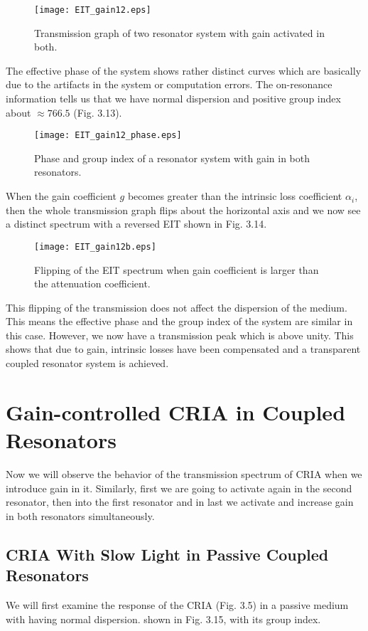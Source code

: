 \begin{figure}[h]
\centering
\texttt{[image: EIT\_gain12.eps]}
\caption{Transmission graph of two resonator system with gain activated in both.}
\end{figure}

The effective phase of the system shows rather distinct curves which are basically due to the artifacts in the system or computation errors. The on-resonance information tells us that we have normal dispersion and positive group index about $\approx 766.5$ (Fig. 3.13). 

\begin{figure}[h]
\centering
\texttt{[image: EIT\_gain12\_phase.eps]}
\caption{Phase and group index of a resonator system with gain in both resonators.}
\end{figure}

When the gain coefficient $g$ becomes greater than the intrinsic loss coefficient $\alpha_{i}$, then the whole transmission graph flips about the horizontal axis and we now see a distinct spectrum with a reversed EIT shown in Fig. 3.14.

\begin{figure}[h]
\centering
\texttt{[image: EIT\_gain12b.eps]}
\caption{Flipping of the EIT spectrum when gain coefficient is larger than the attenuation coefficient.}
\end{figure}

This flipping of the transmission does not affect the dispersion of the medium. This means the effective phase and the group index of the system are similar in this case. However, we now have a transmission peak which is above unity. This shows that due to gain, intrinsic losses have been compensated and a transparent coupled resonator system is achieved.


  

\section{Gain-controlled CRIA in Coupled Resonators}
Now we will observe the behavior of the transmission spectrum of CRIA when we introduce gain in it. Similarly, first we are going to activate again in the second resonator, then into the first resonator and in last we activate and increase gain in both resonators simultaneously. 

\subsection{CRIA With Slow Light in Passive Coupled Resonators}
We will first examine the response of the CRIA (Fig. 3.5) in a passive medium with having normal dispersion. shown in Fig. 3.15, with its group index.

